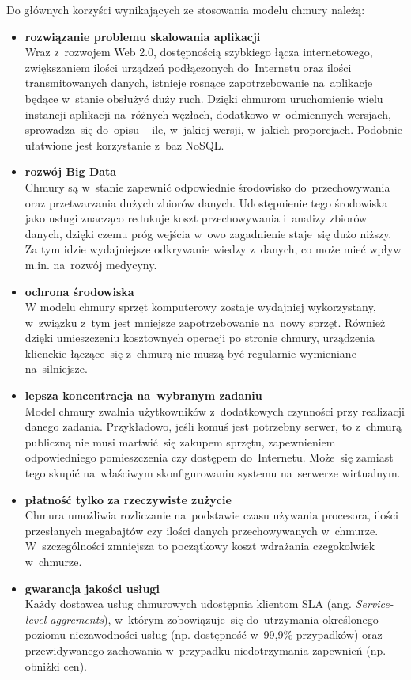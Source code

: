 \documentclass[12pt,a4paper,twoside,titlepage,openright]{book}
\begin{document}
Do głównych korzyści wynikających ze stosowania modelu chmury należą:
\begin{itemize}
\item \textbf{rozwiązanie problemu skalowania aplikacji }\\
Wraz z~rozwojem Web 2.0, dostępnością szybkiego łącza internetowego, zwiększaniem ilości urządzeń podłączonych do~Internetu oraz ilości transmitowanych danych, istnieje rosnące zapotrzebowanie na~aplikacje będące w~stanie obsłużyć duży ruch. Dzięki chmurom uruchomienie wielu instancji aplikacji na~różnych węzłach, dodatkowo w~odmiennych wersjach, sprowadza~się do~opisu -- ile, w~jakiej wersji, w~jakich proporcjach.\cite{kubernetesOreily} Podobnie ułatwione jest korzystanie z~baz NoSQL.

\item \textbf{rozwój Big Data} \\
Chmury są w~stanie zapewnić odpowiednie środowisko do~przechowywania oraz przetwarzania dużych zbiorów danych. Udostępnienie tego środowiska jako usługi znacząco redukuje koszt przechowywania i~analizy zbiorów danych, dzięki czemu próg wejścia w~owo zagadnienie staje~się dużo niższy. Za tym idzie wydajniejsze odkrywanie wiedzy z~danych, co może mieć wpływ m.in. na~rozwój medycyny.

\item \textbf{ochrona środowiska} \\
W modelu chmury sprzęt komputerowy zostaje wydajniej wykorzystany, w~związku z~tym jest mniejsze zapotrzebowanie na~nowy sprzęt. Również dzięki umieszczeniu kosztownych operacji po stronie chmury, urządzenia klienckie łączące~się z~chmurą nie muszą być regularnie wymieniane na~silniejsze.

\item \textbf{lepsza koncentracja na~wybranym zadaniu} \\
Model chmury zwalnia użytkowników z~dodatkowych czynności przy realizacji danego zadania. Przykładowo, jeśli komuś jest potrzebny serwer, to z~chmurą publiczną nie musi martwić~się zakupem sprzętu, zapewnieniem odpowiedniego pomieszczenia czy dostępem do~Internetu. Może~się zamiast tego skupić na~właściwym skonfigurowaniu systemu na~serwerze wirtualnym. 

\item \textbf{płatność tylko za rzeczywiste zużycie} \\
Chmura umożliwia rozliczanie na~podstawie czasu używania procesora, ilości przesłanych megabajtów czy ilości danych przechowywanych w~chmurze. W~szczególności zmniejsza to początkowy koszt wdrażania czegokolwiek w~chmurze.

\item \textbf{gwarancja jakości usługi} \\
Każdy dostawca usług chmurowych udostępnia klientom SLA (ang. \textit{Service-level aggrements}), w~którym zobowiązuje~się do~utrzymania określonego poziomu niezawodności usług (np. dostępność w~99,9\% przypadków) oraz przewidywanego zachowania w~przypadku niedotrzymania zapewnień (np. obniżki cen).

\end{itemize}
\end{document}
